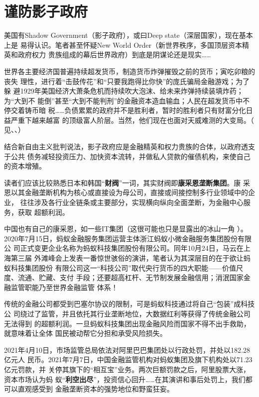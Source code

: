 \section{谨防影子政府}

美国有Shadow Government（影子政府），或曰Deep state（深层国家），现在基本上是
易得认识。笔者甚至怀疑New World Order（新世界秩序，多国顶层资本精英和政府权力
贵族组成的幕后世界政府）到底是阴谋论还是现实……

世界各主要经济国普遍持续超发货币，制造货币炸弹摧毁之前的货币；寅吃卯粮的丧失
理性，进行着“击鼓传花”和“只要我跑得比你快”的庞氏骗局金融游戏；为了躲
避1929年美国经济大萧条危机而持续吹大泡沫、给未来炸弹持续装填炸药；为“大到不
能倒”甚至“大到不能判刑”的金融资本造血输血；人民在超发货币中不停交着铸币暗
税……负债累累的政府并不是胜利者，暂时的胜利者只有财富分化日益严重下越来越富
的顶级富人阶层。当然，他们现在也面对天威难测的大变局。（
见\cite{piepenburg2022gold}、\cite{streeck2017will}、）

结合新自由主义批判说法，影子政府应是金融精英和权力贵族的合体，以政府透支于公共
债务减轻投资压力、加快资本流转，并做私人贷款的催债机构，来使自己的资本增殖。

读者们应该比较熟悉日本和韩国“\textbf{财阀}”一词，其实财阀即\textbf{康采恩垄断集团}。康
采恩以其金融垄断机构为核心或直接设为母公司，直接或间接控制多行业领域中的企业，
往往涉及各行业全链条或主要部分，实现横向纵向全面垄断，为金融中心服务，获取
超额利润。

中国也有自己的康采恩，如一些IT集团（这很可能也只是显露出的冰山一角
）。2020年7月15日，蚂蚁金融服务集团运营主体浙江蚂蚁小微金融服务集团股份有限公
司正式变更企业名称为蚂蚁科技集团股份有限公司。同年10月24日，马云在上海第三届
外滩峰会上发表一番惊世骇俗的演讲，笔者认为其深层目的在于欲让蚂蚁科技集团股份
有限公司这一“科技公司”取代央行货币的四大职能——价值尺度、流通、贮藏、支付
手段；还要超高杠杆、无节制发展金融信用；消泯国家金融监管职能乃至世界金融监管
体系！

传统的金融公司都受到巴塞尔协议的限制，可是蚂蚁科技通过将自己“包装”成科技公
司绕过了监管，并且依托其行业垄断地位，大数据红利等获得了传统金融公司无法得到
的超额利润。一旦蚂蚁科技集团出现金融风险而国家不得不出手救助，就意味着让全体
国民被动帮它分担和承受风险损失。


2021年4月10日，市场监管总局依法对阿里巴巴集团处以行政处罚，并处以182.28亿元人
民币。2021年7月7日，中国金融监管机构对蚂蚁集团及旗下机构处以71.23亿元罚款，并
关停其旗下的“相互宝”业务。两次巨额罚款之后，阿里股票大涨，资本市场认为蚂
蚁“\textbf{利空出尽}”，投资信心回升……在其演讲和事后处罚上，我们都可以直观感受到
金融垄断资本的强势地位和野蛮狂妄。



